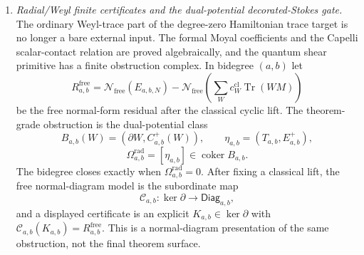 \begin{enumerate}
  Connected large-\(N\) cumulants are then defined by
  \[
    \langle F_1,\ldots,F_k\rangle^{c}_{N,\Omega}
      =
      [t_1\cdots t_k]\,
      \log\omega_{N,\Omega}
      \left(\exp\Bigl(\sum_i t_iF_i\Bigr)\right),
  \]
  after finite-\(N\) trace identities and the empty-trace scalar have
  been treated in the normalization \(\nu_{\Omega,N}\).  A physical
  large-\(N\) theorem is the asymptotic statement, in
  \(\mathcal T_\Omega\),
  \[
    \langle F_1,\ldots,F_k\rangle^{c}_{N,\Omega}
      \sim
      \sum_{g\ge0}
      N^{2-2g-k}F^{\Omega}_{g;k}(F_1,\ldots,F_k),
  \]
  or the same formula with a different explicitly chosen
  \(\hbar_{\mathrm{QME}},\hbar_{\mathrm{W}},\hbar_\omega,N\)-scaling.
  The algebraic degreewise stable trace theorem
  supplies candidate primitive generators only; it does not choose
  \(\omega_{N,\Omega}\), \(\nu_{\Omega,N}\), \(\mathcal T_\Omega\), or
  the Ward identities.

  The trace obstruction vector is
  \[
    \operatorname{Ob}_{\mathrm{tr},\Omega}
    =
    (\operatorname{ob}_{\mathrm{state}},
     \operatorname{ob}_{\mathrm{norm}},
     \operatorname{ob}_{\mathrm{Ward}},
     \operatorname{ob}_{\mathrm{cum}},
     \operatorname{ob}_{\mathrm{conv}},
     \operatorname{ob}_{\mathrm{QME}},
     \operatorname{ob}_{\mathrm{src}}).
  \]
  Vanishing means that the state exists, the normalization is fixed, the
  QME and moment-map Ward identities hold, connected cumulants are
  defined in the chosen topology, the large-\(N\) expansion converges
  asymptotically there, and all external factorization-homology or
  Costello analogies have been audited against primary sources and
  matched to this local brane model.

  \item \emph{Radial/Weyl finite certificates and the
  dual-potential decorated-Stokes gate.}
  The ordinary Weyl-trace part of the degree-zero Hamiltonian trace
  target is no longer a bare external input.  The formal Moyal
  coefficients and the Capelli scalar-contact relation are proved
  algebraically, and the quantum shear primitive has a finite
  obstruction complex.  In bidegree \((a,b)\) let
  \[
    R^{\mathrm{free}}_{a,b}
      =
      \mathcal N_{\mathrm{free}}(E_{a,b,N})
      -
      \mathcal N_{\mathrm{free}}
      \left(\sum_W c^{\mathrm{cl}}_W\operatorname{Tr}(WM)\right)
  \]
  be the free normal-form residual after the classical cyclic lift.  The
  theorem-grade obstruction is the dual-potential class
  \[
    B_{a,b}(W)=(\partial W,C^+_{a,b}(W)),\qquad
    \eta_{a,b}=(T_{a,b},E^+_{a,b}),
  \]
  \[
    \Omega^{\mathrm{rad}}_{a,b}
    =
    [\eta_{a,b}]\in\operatorname{coker}B_{a,b}.
  \]
  The bidegree closes exactly when
  \(\Omega^{\mathrm{rad}}_{a,b}=0\).  After fixing a classical lift, the
  free normal-diagram model is the subordinate map
  \[
    \mathcal C_{a,b}\colon
    \ker\partial\longrightarrow\mathsf{Diag}_{a,b},
  \]
  and a displayed certificate is an explicit
  \(K_{a,b}\in\ker\partial\) with
  \(\mathcal C_{a,b}(K_{a,b})=R^{\mathrm{free}}_{a,b}\).  This is a
  normal-diagram presentation of the same obstruction, not the final
  theorem surface.


\end{enumerate}
